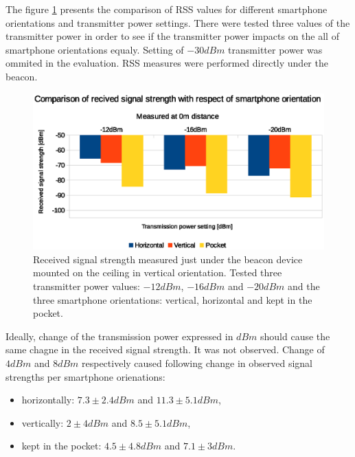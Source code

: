 \documentclass[../main.tex]{subfiles}
\begin{document}
The figure \ref{fig:tests_case3_rssi_vs_smartphone_orientation} presents the comparison of RSS values for different smartphone orientations and transmitter power settings.
There were tested three values of the transmitter power in order to see if the transmitter power impacts on the all of smartphone orientations equaly. Setting of $-30dBm$ transmitter power was ommited in the evaluation. RSS measures were performed directly under the beacon.

\begin{figure}[!htbp]
\includegraphics[width=\textwidth, keepaspectratio]{pictures/tests_case3_rssi_vs_smartphone_orientation}
\centering
\caption{Received signal strength measured just under the beacon device mounted on the ceiling in vertical orientation. Tested three transmitter power values: $-12dBm$, $-16dBm$ and $-20dBm$ and the three smartphone orientations: vertical, horizontal and kept in the pocket.}
\label{fig:tests_case3_rssi_vs_smartphone_orientation}
\end{figure}

Ideally, change of the transmission power expressed in $dBm$ should cause the same chagne in the received signal strength. It was not observed. Change of $4 dBm$ and $8 dBm$ respectively caused following change in observed signal strengths per smartphone orienations:
\begin{itemize}
	\item horizontally: $7.3\pm2.4 dBm$ and $11.3\pm5.1 dBm$,
	\item vertically: $2\pm4 dBm$ and $8.5\pm5.1 dBm$,
	\item kept in the pocket: $4.5\pm4.8 dBm$ and $7.1\pm3 dBm$.
\end{itemize}
\end{document}
